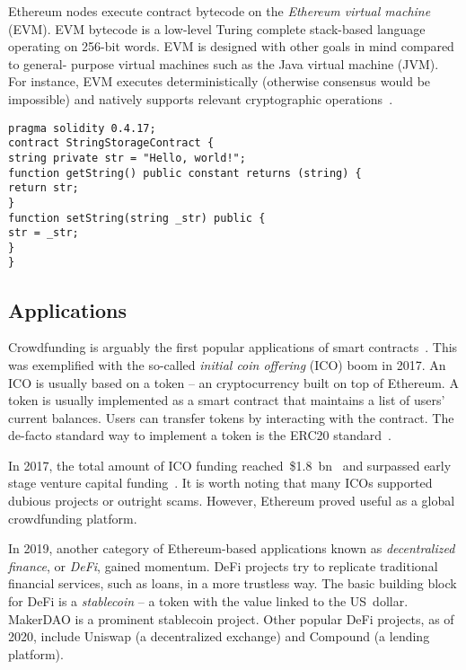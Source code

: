 Ethereum nodes execute contract bytecode on the \textit{Ethereum virtual machine} (EVM).
EVM bytecode is a low-level Turing complete stack-based language operating on 256-bit words.
EVM is designed with other goals in mind compared to general- purpose virtual machines such as the Java virtual machine (JVM).
For instance, EVM executes deterministically (otherwise consensus would be impossible) and natively supports relevant cryptographic operations~\cite{Buterin2017}.

\begin{lstlisting}[language=Solidity, label={lst:SolidityExample}, caption=A simple contract in Solidity]
pragma solidity 0.4.17;
contract StringStorageContract {
string private str = "Hello, world!";
function getString() public constant returns (string) {
return str;
}
function setString(string _str) public {
str = _str;
}
}
\end{lstlisting}


\subsection{Applications}

Crowdfunding is arguably the first popular applications of smart contracts~\cite{McAdams2017}.
This was exemplified with the so-called \textit{initial coin offering} (ICO) boom in 2017.
An ICO is usually based on a token -- an cryptocurrency built on top of Ethereum.
A token is usually implemented as a smart contract that maintains a list of users' current balances.
Users can transfer tokens by interacting with the contract.
The de-facto standard way to implement a token is the ERC20 standard~\cite{Victor2019}.

In 2017, the total amount of ICO funding reached~\$1.8~bn~\cite{CoindeakICOTracker} and surpassed early stage venture capital funding~\cite{Sunnarborg2017}.
It is worth noting that many ICOs supported dubious projects or outright scams.
However, Ethereum proved useful as a global crowdfunding platform.

In 2019, another category of Ethereum-based applications known as \textit{decentralized finance}, or \textit{DeFi}, gained momentum.
DeFi projects try to replicate traditional financial services, such as loans, in a more trustless way.
The basic building block for DeFi is a \textit{stablecoin} -- a token with the value linked to the US~dollar.
MakerDAO is a prominent stablecoin project.
Other popular DeFi projects, as of 2020, include Uniswap (a decentralized exchange) and Compound (a lending platform).

